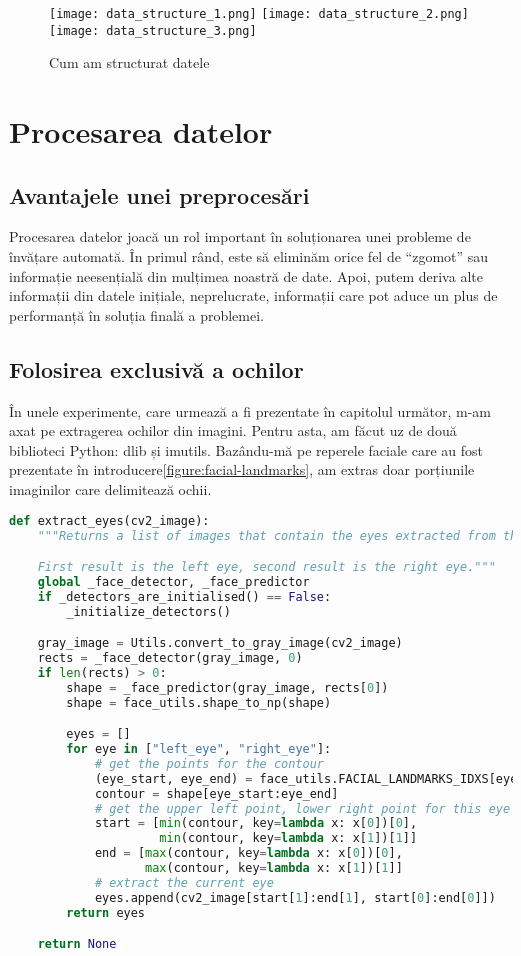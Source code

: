 \begin{figure}[ht]
    \centering
    \texttt{[image: data\_structure\_1.png]}
    \texttt{[image: data\_structure\_2.png]}
    \texttt{[image: data\_structure\_3.png]}
    \caption{Cum am structurat datele}
\end{figure}

\section{Procesarea datelor}
\subsection{Avantajele unei preprocesări}
Procesarea datelor joacă un rol important în soluționarea unei probleme de învățare automată.
În primul rând, este  să eliminăm orice fel de ``zgomot'' sau informație neesențială din mulțimea noastră de date.
Apoi, putem deriva alte informații din datele inițiale, neprelucrate, informații care pot aduce un plus de performanță în soluția finală a problemei.

\subsection{Folosirea exclusivă a ochilor}
\label{data-processing:eyes}
În unele experimente, care urmează a fi prezentate în capitolul următor, m-am axat pe extragerea ochilor din imagini.
Pentru asta, am făcut uz de două biblioteci Python: dlib și imutils.
Bazându-mă pe reperele faciale care au fost prezentate în introducere\ref{figure:facial-landmarks}, am extras doar porțiunile imaginilor care delimitează ochii.

\begin{lstlisting}[language=Python, caption=Extragerea ochilor dintr-o imagine]
def extract_eyes(cv2_image):
    """Returns a list of images that contain the eyes extracted from the original image.

    First result is the left eye, second result is the right eye."""
    global _face_detector, _face_predictor
    if _detectors_are_initialised() == False:
        _initialize_detectors()

    gray_image = Utils.convert_to_gray_image(cv2_image)
    rects = _face_detector(gray_image, 0)
    if len(rects) > 0:
        shape = _face_predictor(gray_image, rects[0])
        shape = face_utils.shape_to_np(shape)

        eyes = []
        for eye in ["left_eye", "right_eye"]:
            # get the points for the contour
            (eye_start, eye_end) = face_utils.FACIAL_LANDMARKS_IDXS[eye]
            contour = shape[eye_start:eye_end]
            # get the upper left point, lower right point for this eye
            start = [min(contour, key=lambda x: x[0])[0],
                     min(contour, key=lambda x: x[1])[1]]
            end = [max(contour, key=lambda x: x[0])[0],
                   max(contour, key=lambda x: x[1])[1]]
            # extract the current eye
            eyes.append(cv2_image[start[1]:end[1], start[0]:end[0]])
        return eyes

    return None
\end{lstlisting}

